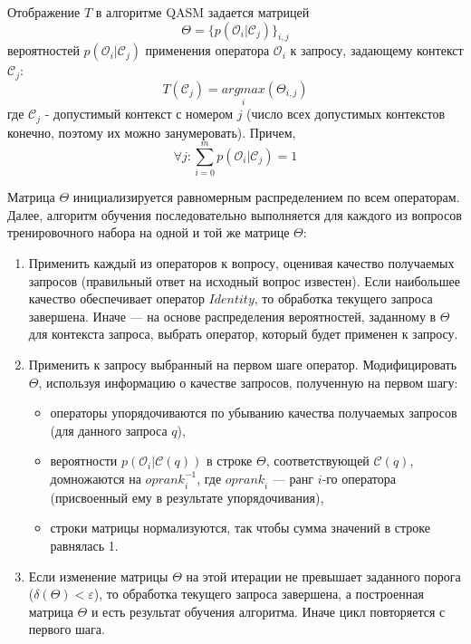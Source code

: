 \documentclass{article}
\begin{document}


Отображение $T$ в алгоритме QASM задается матрицей
$$\Theta = \{p(\mathcal{O}_i|\mathcal{C}_j)\}_{i,j}$$
вероятностей $p(\mathcal{O}_i|\mathcal{C}_j)$
применения оператора $\mathcal{O}_i$ к запросу, задающему контекст $\mathcal{C}_j$:
\[
T(\mathcal{C}_j)=\underset{i}{argmax}(\Theta_{i,j})
\]
где $\mathcal{C}_j$ - допустимый контекст с номером $j$
(число всех допустимых контекстов конечно, поэтому их можно занумеровать).
Причем, $$\forall j : \sum_{i=0}^m p(\mathcal{O}_i|\mathcal{C}_j)=1$$



Матрица $\Theta$ инициализируется равномерным распределением 
по всем операторам. Далее,
алгоритм обучения последовательно выполняется для каждого из вопросов
тренировочного набора на одной и той же матрице $\Theta$:
\begin{enumerate}
\item 
Применить каждый из операторов к вопросу, оценивая качество
получаемых запросов (правильный ответ на исходный вопрос известен).
Если наибольшее качество обеспечивает оператор $Identity$,
то обработка текущего запроса завершена.
Иначе --- на основе распределения вероятностей, заданному в $\Theta$ для
контекста запроса,
выбрать оператор, который будет применен к запросу.

\item
Применить к запросу выбранный на первом шаге оператор.
Модифицировать $\Theta$, используя информацию о качестве
запросов, полученную на первом шагу:
\begin{itemize}
\item операторы упорядочиваются по убыванию качества получаемых
      запросов (для данного запроса $q$),
\item вероятности $p(\mathcal{O}_i|\mathcal{C}(q))$
      в строке $\Theta$, соответствующей $\mathcal{C}(q)$,
      домножаются на $\mathit{oprank}_{i}^{-1}$,
     где $\mathit{oprank}_i$ --- ранг $i$-го оператора
     (присвоенный ему в результате упорядочивания),
\item строки матрицы нормализуются, так чтобы сумма значений в строке
      равнялась 1.
\end{itemize}
\item
Если изменение матрицы $\Theta$ на этой итерации не превышает заданного порога
($\delta(\Theta) < \varepsilon$), то обработка текущего запроса
завершена, а построенная матрица $\Theta$ и есть результат обучения алгоритма.
Иначе цикл повторяется с первого шага.
\end{enumerate}
\end{document}
